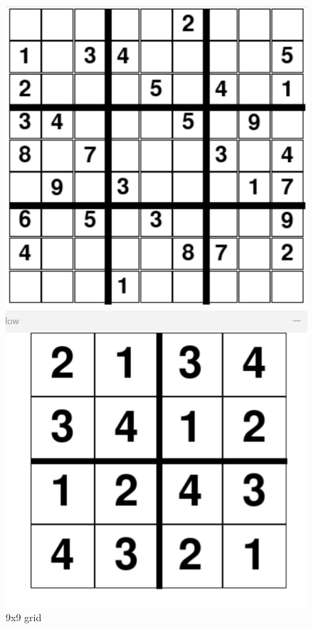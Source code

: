 \documentclass[]{final_report}
\begin{document}
\begin{figure}[ht]
\begin{minipage}{0.3\textwidth}
        \includegraphics[width=\textwidth]{images/9x9 unsolved.png} 
        \caption{9x9 grid} 
        \label{fig:unsolved 9x9} 
    \end{minipage}
    \begin{minipage}{0.3\textwidth} 
        \includegraphics[width=\textwidth]{images/2x2 solved.png} 

\end{minipage}
\end{figure}
\end{document}
